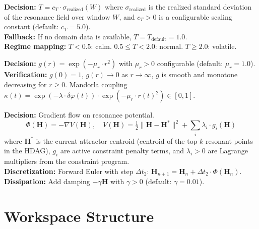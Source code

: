 \documentclass[10pt,a4paper]{article}
\theoremstyle{definition}\newtheorem{definition}{Def}[section]
\theoremstyle{plain}\newtheorem{theorem}{Thm}[section]
\begin{document}
\begin{resolvebox}
\textbf{Decision:} $T = c_T \cdot \sigma_{\text{realized}}(W)$ where $\sigma_{\text{realized}}$ is the realized standard deviation of the resonance field over window $W$, and $c_T > 0$ is a configurable scaling constant (default: $c_T = 5.0$).\\
\textbf{Fallback:} If no domain data is available, $T = T_{\text{default}} = 1.0$.\\
\textbf{Regime mapping:} $T < 0.5$: calm. $0.5 \leq T < 2.0$: normal. $T \geq 2.0$: volatile.
\end{resolvebox}

\begin{resolvebox}
\textbf{Decision:} $g(r) = \exp(-\mu_r \cdot r^2)$ with $\mu_r > 0$ configurable (default: $\mu_r = 1.0$).\\
\textbf{Verification:} $g(0) = 1$, $g(r) \to 0$ as $r \to \infty$, $g$ is smooth and monotone decreasing for $r \geq 0$. Mandorla coupling $\kappa(t) = \exp(-\lambda \cdot \delta\varphi(t)) \cdot \exp(-\mu_r \cdot r(t)^2) \in [0,1]$.
\end{resolvebox}

\begin{resolvebox}
\textbf{Decision:} Gradient flow on resonance potential.
\[
  \Phi(\mathbf{H}) = -\nabla V(\mathbf{H}), \quad V(\mathbf{H}) = \tfrac{1}{2}\|\mathbf{H} - \mathbf{H}^*\|^2 + \sum_i \lambda_i \cdot g_i(\mathbf{H})
\]
where $\mathbf{H}^*$ is the current attractor centroid (centroid of the top-$k$ resonant points in the HDAG), $g_i$ are active constraint penalty terms, and $\lambda_i > 0$ are Lagrange multipliers from the constraint program.\\
\textbf{Discretization:} Forward Euler with step $\Delta t_2$: $\mathbf{H}_{n+1} = \mathbf{H}_n + \Delta t_2 \cdot \Phi(\mathbf{H}_n)$.\\
\textbf{Dissipation:} Add damping $-\gamma \mathbf{H}$ with $\gamma > 0$ (default: $\gamma = 0.01$).
\end{resolvebox}

\section{Workspace Structure}
\label{sec:workspace}
\end{document}
